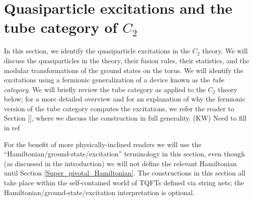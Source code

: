 \documentclass[12pt,a4paper]{article}
\newcommand{\kw}[1]{{\color{kwcolor}\footnotesize{(KW) #1}}}
\begin{document}
\section{Quasiparticle excitations and the tube category of $C_2$} \label{C2_quasiparticles}

In this section, we identify the quasiparticle excitations 
in the $C_2$ theory.
We will discuss the quasiparticles in the theory, their fusion rules, their statistics, and the 
modular transformations of the ground states on the torus.
We will identify the excitations using a fermionic generalization of a device known as the {\it tube category}. 
We will briefly review the tube category as applied to the $C_2$ theory below; 
for a more detailed overview and for an explanation of why the fermionic version of the tube category computes the excitations, 
we refer the reader to Section \ref{}, where we discuss the construction in full generality. 
\kw{Need to fill in ref}


For the benefit of more physically-inclined readers 
we will use the ``Hamiltonian/ground-state/excitation'' terminology 
in this section, 
even though (as discussed in the introduction) we will not define the relevant Hamiltonian until Section \ref{Super_pivotal_Hamiltonian}.
The constructions in this section all take place within the self-contained world of TQFTs defined via string nets;
the Hamiltonian/ground-state/excitation interpretation is optional.
\end{document}
